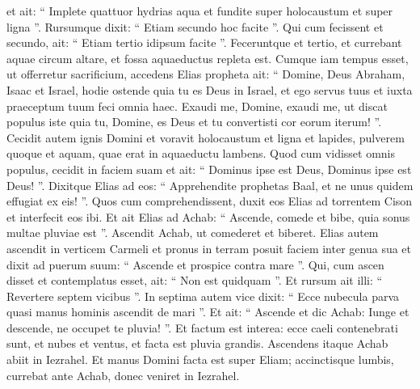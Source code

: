 \begin{biblechapter}
\begin{biblechapter}
\begin{biblechapter}
\begin{biblechapter}
\begin{biblechapter}
\begin{biblechapter}
\begin{biblechapter}
\begin{biblechapter}
\begin{biblechapter}
\begin{biblechapter}
\begin{biblechapter}
\begin{biblechapter}
\begin{biblechapter}
\begin{biblechapter}
\begin{biblechapter}
\begin{biblechapter}
\begin{biblechapter}
\begin{biblechapter}
\verse et ait: “ Implete quattuor hydrias aqua et fundite super holocaustum et super ligna ”. Rursumque dixit: “ Etiam secundo hoc facite ”. Qui cum fecissent et secundo, ait: “ Etiam tertio idipsum facite ”. Feceruntque et tertio, 
\verse et currebant aquae circum altare, et fossa aquaeductus repleta est.
 \verse Cumque iam tempus esset, ut offerretur sacrificium, accedens Elias propheta ait: “ Domine, Deus Abraham, Isaac et Israel, hodie ostende quia tu es Deus in Israel, et ego servus tuus et iuxta praeceptum tuum feci omnia haec. 
\verse Exaudi me, Domine, exaudi me, ut discat populus iste quia tu, Domine, es Deus et tu convertisti cor eorum iterum! ”.
 \verse Cecidit autem ignis Domini et voravit holocaustum et ligna et lapides, pulverem quoque et aquam, quae erat in aquaeductu lambens. 
\verse Quod cum vidisset omnis populus, cecidit in faciem suam et ait: “ Dominus ipse est Deus, Dominus ipse est Deus! ”. 
\verse Dixitque Elias ad eos: “ Apprehendite prophetas Baal, et ne unus quidem effugiat ex eis! ”. Quos cum comprehendissent, duxit eos Elias ad torrentem Cison et interfecit eos ibi.
 \verse Et ait Elias ad Achab: “ Ascende, comede et bibe, quia sonus multae pluviae est ”. 
\verse Ascendit Achab, ut comederet et biberet. Elias autem ascendit in verticem Carmeli et pronus in terram posuit faciem inter genua sua 
\verse et dixit ad puerum suum: “ Ascende et prospice contra mare ”. Qui, cum ascen disset et contemplatus esset, ait: “ Non est quidquam ”. Et rursum ait illi: “ Revertere septem vicibus ”. 
\verse In septima autem vice dixit: “ Ecce nubecula parva quasi manus hominis ascendit de mari ”. Et ait: “ Ascende et dic Achab: Iunge et descende, ne occupet te pluvia! ”. 
\verse Et factum est interea: ecce caeli contenebrati sunt, et nubes et ventus, et facta est pluvia grandis. Ascendens itaque Achab abiit in Iezrahel. 
\verse Et manus Domini facta est super Eliam; accinctisque lumbis, currebat ante Achab, donec veniret in Iezrahel.
 

\end{biblechapter}
\end{biblechapter}
\end{biblechapter}
\end{biblechapter}
\end{biblechapter}
\end{biblechapter}
\end{biblechapter}
\end{biblechapter}
\end{biblechapter}
\end{biblechapter}
\end{biblechapter}
\end{biblechapter}
\end{biblechapter}
\end{biblechapter}
\end{biblechapter}
\end{biblechapter}
\end{biblechapter}
\end{biblechapter}
